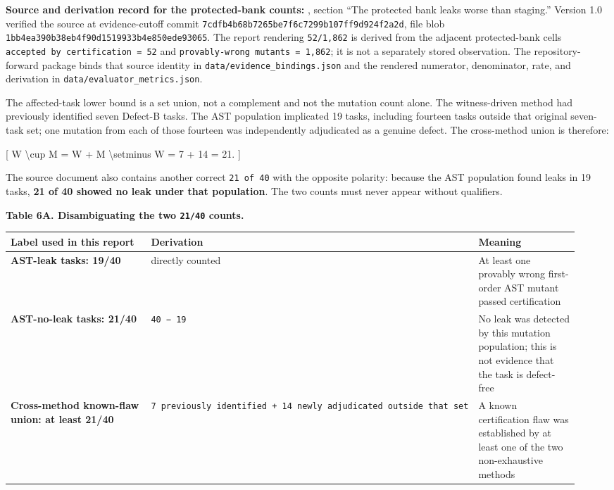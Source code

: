 \documentclass[
]{article}
\newcounter{none} %
\begin{document}
\textbf{Source and derivation record for the protected-bank counts:}
, section
``The protected bank leaks worse than staging.'' Version 1.0 verified
the source at evidence-cutoff commit
\texttt{7cdfb4b68b7265be7f6c7299b107ff9d924f2a2d}, file blob
\texttt{1bb4ea390b38eb4f90d1519933b4e850ede93065}. The report rendering
\texttt{52/1,862} is derived from the adjacent protected-bank cells
\texttt{accepted\ by\ certification\ =\ 52} and
\texttt{provably-wrong\ mutants\ =\ 1,862}; it is not a separately
stored observation. The repository-forward package binds that source
identity in \texttt{data/evidence\_bindings.json} and the rendered
numerator, denominator, rate, and derivation in
\texttt{data/evaluator\_metrics.json}.

The affected-task lower bound is a set union, not a complement and not
the mutation count alone. The witness-driven method had previously
identified seven Defect-B tasks. The AST population implicated 19 tasks,
including fourteen tasks outside that original seven-task set; one
mutation from each of those fourteen was independently adjudicated as a
genuine defect. The cross-method union is therefore:

{[} \textbar W \textbackslash cup M\textbar{} = \textbar W\textbar{} +
\textbar M \textbackslash setminus W\textbar{} = 7 + 14 = 21. {]}

The source document also contains another correct \texttt{21\ of\ 40}
with the opposite polarity: because the AST population found leaks in 19
tasks, \textbf{21 of 40 showed no leak under that population}. The two
counts must never appear without qualifiers.

\textbf{Table 6A. Disambiguating the two \texttt{21/40} counts.}

{\def\LTcaptype{none} %
\begin{longtable}[]{@{}p{0.48\linewidth}p{0.18\linewidth}p{0.28\linewidth}@{}}
\toprule\noalign{}
Label used in this report & Derivation & Meaning \\
\midrule\noalign{}
\endhead
\bottomrule\noalign{}
\endlastfoot
\textbf{AST-leak tasks: 19/40} & directly counted & At least one
provably wrong first-order AST mutant passed certification \\
\textbf{AST-no-leak tasks: 21/40} & \texttt{40\ −\ 19} & No leak was
detected by this mutation population; this is not evidence that the task
is defect-free \\
\textbf{Cross-method known-flaw union: at least 21/40} &
\texttt{7\ previously\ identified\ +\ 14\ newly\ adjudicated\ outside\ that\ set}
& A known certification flaw was established by at least one of the two
non-exhaustive methods \\
\end{longtable}
}
\end{document}
